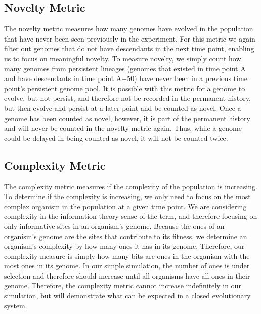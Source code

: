 \documentclass[letterpaper]{article}
\begin{document}
\subsection{Novelty Metric}
    The novelty metric measures how many genomes have evolved in the population that have never been seen previously in the experiment. For this metric we again filter out genomes that do not have descendants in the next time point, enabling us to focus on meaningful novelty. To measure novelty, we simply count how many genomes from persistent lineages (genomes that existed in time point A and have descendants in time point A+50) have never been in a previous time point’s persistent genome pool. It is possible with this metric for a genome to evolve, but not persist, and therefore not be recorded in the permanent history, but then evolve and persist at a later point and be counted as novel. Once a genome has been counted as novel, however, it is part of the permanent history and will never be counted in the novelty metric again. Thus, while a genome could be delayed in being counted as novel, it will not be counted twice.
    

\subsection{Complexity Metric}
    The complexity metric measures if the complexity of the population is increasing. To determine if the complexity is increasing, we only need to focus on the most complex organism in the population at a given time point. We are considering complexity in the information theory sense of the term, and therefore focusing on only informative sites in an organism’s genome. Because the ones of an organism’s genome are the sites that contribute to its fitness, we determine an organism’s complexity by how many ones it has in its genome. Therefore, our complexity measure is simply how many bits are ones in the organism with the most ones in its genome. In our simple simulation, the number of ones is under selection and therefore should increase until all organisms have all ones in their genome. Therefore, the complexity metric cannot increase indefinitely in our simulation, but will demonstrate what can be expected in a closed evolutionary system.
\end{document}
